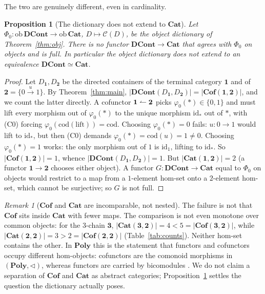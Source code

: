\documentclass[11pt,a4paper]{amsart}
\newcommand{\Cat}{\mathbf{Cat}}
\newcommand{\Cof}{\mathbf{Cof}}
\newcommand{\DCont}{\mathbf{DCont}}
\newcommand{\Poly}{\mathbf{Poly}}
\newcommand{\id}{\mathrm{id}}
\newcommand{\cod}{\mathrm{cod}}
\newcommand{\ob}{\mathrm{ob}\,}
\newcommand{\co}{\mathrel{\text{\reflectbox{$\rightharpoonup$}}}}
\theoremstyle{plain}
\newtheorem{proposition}[theorem]{Proposition}
\theoremstyle{definition}
\theoremstyle{remark}
\newtheorem{remark}[theorem]{Remark}
\begin{document}
The two are genuinely different, even in cardinality.

\begin{proposition}[The dictionary does not extend to $\Cat$]\label{prop:neq}
Let $\Phi_0\colon\ob\DCont\to\ob\Cat$, $D\mapsto\mathcal C(D)$, be the object dictionary
of Theorem~\ref{thm:obj}. There is no functor $\DCont\to\Cat$ that agrees with $\Phi_0$
on objects and is full. In particular the object dictionary does not extend to an
equivalence $\DCont\simeq\Cat$.
\end{proposition}

\begin{proof}
Let $D_{\mathbf 1},D_{\mathbf 2}$ be the directed containers of the terminal category
$\mathbf 1$ and of $\mathbf 2=\{0\xrightarrow{u}1\}$. By Theorem~\ref{thm:main},
$|\DCont(D_{\mathbf 1},D_{\mathbf 2})|=|\Cof(\mathbf 1,\mathbf 2)|$, and we count the
latter directly. A cofunctor $\mathbf 1\co\mathbf 2$ picks $\varphi_0(\ast)\in\{0,1\}$
and must lift every morphism out of $\varphi_0(\ast)$ to the unique morphism $\id_\ast$
out of $\ast$, with (C0) forcing $\varphi_0(\cod(\text{lift}))=\cod$. Choosing
$\varphi_0(\ast)=0$ fails: $u\colon 0\to 1$ would lift to $\id_\ast$, but then (C0)
demands $\varphi_0(\ast)=\cod(u)=1\neq 0$. Choosing $\varphi_0(\ast)=1$ works: the only
morphism out of $1$ is $\id_1$, lifting to $\id_\ast$. So
$|\Cof(\mathbf 1,\mathbf 2)|=1$, whence $|\DCont(D_{\mathbf 1},D_{\mathbf 2})|=1$. But
$|\Cat(\mathbf 1,\mathbf 2)|=2$ (a functor $\mathbf 1\to\mathbf 2$ chooses either
object). A functor $G\colon\DCont\to\Cat$ equal to $\Phi_0$ on objects would restrict to
a map from a $1$-element hom-set onto a $2$-element hom-set, which cannot be surjective;
so $G$ is not full.
\end{proof}

\begin{remark}[$\Cof$ and $\Cat$ are incomparable, not nested]
The failure is not that $\Cof$ sits inside $\Cat$ with fewer maps. The comparison is not
even monotone over common objects: for the $3$-chain $\mathbf 3$,
$|\Cat(\mathbf 3,\mathbf 2)|=4<5=|\Cof(\mathbf 3,\mathbf 2)|$, while
$|\Cat(\mathbf 2,\mathbf 2)|=3>2=|\Cof(\mathbf 2,\mathbf 2)|$
(Table~\ref{tab:counts}). Neither hom-set contains the other. In $\Poly$ this is the
statement that functors and cofunctors occupy different hom-objects: cofunctors are the
comonoid morphisms in $(\Poly,\triangleleft)$, whereas functors are carried by
bicomodules \cite{AU16,SS}. We do not claim a separation of $\Cof$ and $\Cat$ as
abstract categories; Proposition~\ref{prop:neq} settles the question the dictionary
actually poses.
\end{remark}
\end{document}
